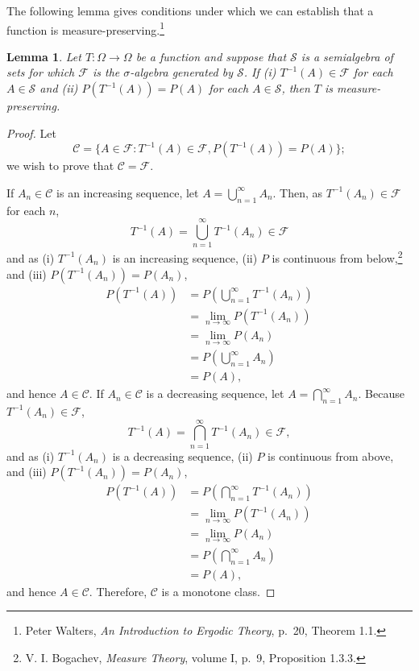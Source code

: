 \documentclass{article}
\newtheorem{lemma}[theorem]{Lemma}
\theoremstyle{definition}
\begin{document}
The following lemma gives conditions under which we can establish that a function is measure-preserving.\footnote{Peter Walters, {\em An Introduction to Ergodic Theory}, p.~20, Theorem 1.1.}

\begin{lemma}
Let $T:\Omega \to \Omega$ be a function and suppose that $\mathscr{S}$ is a semialgebra of sets for which
$\mathscr{F}$ is the $\sigma$-algebra generated by $\mathscr{S}$. If
(i) $T^{-1}(A) \in \mathscr{F}$ for each $A \in \mathscr{S}$ and
(ii) $P(T^{-1}(A))=P(A)$ for each $A \in \mathscr{S}$, then $T$ is measure-preserving.
\label{semialgebra}
\end{lemma}
\begin{proof}
Let
\[
\mathscr{C} = \{A \in \mathscr{F}: T^{-1}(A) \in \mathscr{F}, P(T^{-1}(A))=P(A)\};
\]
we wish to prove that $\mathscr{C}=\mathscr{F}$. 

If $A_n \in \mathscr{C}$ is an increasing sequence, let $A = \bigcup_{n=1}^\infty A_n$. 
Then, as $T^{-1}(A_n) \in \mathscr{F}$ for each $n$,
\[
T^{-1}(A) = \bigcup_{n=1}^\infty T^{-1}(A_n) \in \mathscr{F}
\]
and as (i) $T^{-1}(A_n)$ is an increasing sequence,
(ii) $P$ is continuous from below,\footnote{V. I. Bogachev, {\em Measure Theory}, volume I, p.~9, Proposition 1.3.3.}
and (iii) $P(T^{-1}(A_n))=P(A_n)$,
\begin{align*}
P(T^{-1}(A))&=P\left(\bigcup_{n=1}^\infty T^{-1}(A_n) \right)\\
&=\lim_{n \to \infty} P(T^{-1}(A_n))\\
&=\lim_{n \to \infty} P(A_n)\\
&=P\left( \bigcup_{n=1}^\infty A_n \right)\\
&=P(A),
\end{align*}
and hence $A \in \mathscr{C}$.
If $A_n \in \mathscr{C}$ is a decreasing sequence, let $A = \bigcap_{n=1}^\infty A_n$. 
Because $T^{-1}(A_n) \in \mathscr{F}$,
\[
T^{-1}(A) = \bigcap_{n=1}^\infty T^{-1}(A_n) \in \mathscr{F},
\]
and as (i) $T^{-1}(A_n)$ is a decreasing sequence, 
(ii) $P$ is continuous from above, and (iii) $P(T^{-1}(A_n))=P(A_n)$,
\begin{align*}
P(T^{-1}(A))&=P\left(\bigcap_{n=1}^\infty T^{-1}(A_n) \right)\\
&=\lim_{n \to \infty} P(T^{-1}(A_n))\\
&=\lim_{n \to \infty} P(A_n)\\
&=P\left(\bigcap_{n=1}^\infty A_n \right)\\
&=P(A),
\end{align*}
and hence $A \in \mathscr{C}$. 
Therefore, $\mathscr{C}$ is a monotone class.


\end{proof}
\end{document}
